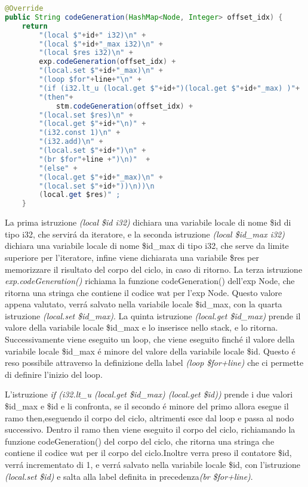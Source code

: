 \documentclass[../../main.tex]{subfiles}
\begin{document}
\begin{lstlisting}[language=Java, caption={codeGeneration() per il for Node}, label={lst:codeGenerationFor}]
@Override
public String codeGeneration(HashMap<Node, Integer> offset_idx) {
    return  
        "(local $"+id+" i32)\n" +
        "(local $"+id+"_max i32)\n" +
        "(local $res i32)\n" +
        exp.codeGeneration(offset_idx) +
        "(local.set $"+id+"_max)\n" +   
        "(loop $for"+line+"\n" +       
        "(if (i32.lt_u (local.get $"+id+")(local.get $"+id+"_max) )"+
        "(then"+
            stm.codeGeneration(offset_idx) +
        "(local.set $res)\n" +
        "(local.get $"+id+"\n)" +     
        "(i32.const 1)\n" +
        "(i32.add)\n" +    
        "(local.set $"+id+")\n" +
        "(br $for"+line +")\n)"  +
        "(else" +
        "(local.get $"+id+"_max)\n" + 
        "(local.set $"+id+"))\n))\n
        (local.get $res)" ;   
    }

\end{lstlisting}

La prima istruzione \textit{(local \$id i32)} dichiara una variabile locale di nome \$id di tipo i32, che servirá da iteratore, e la seconda istruzione \textit{(local \$id\_max i32)} dichiara una variabile locale di nome \$id\_max di tipo i32, che serve da limite superiore per l'iteratore, infine viene dichiarata una variabile \$res per memorizzare il risultato del corpo del ciclo, in caso di ritorno.
La terza istruzione \textit{exp.codeGeneration()} richiama la funzione codeGeneration() dell'exp Node, che ritorna una stringa che contiene il codice wat per l'exp Node.
Questo valore appena valutato, verrá salvato nella variabile locale \$id\_max, con la quarta istruzione \textit{(local.set \$id\_max)}.
La quinta istruzione \textit{(local.get \$id\_max)} prende il valore della variabile locale \$id\_max e lo inserisce nello stack, e lo ritorna.
Successivamente viene eseguito un loop, che viene eseguito finché il valore della variabile locale \$id\_max é minore del valore della variabile locale \$id.
Questo é reso possibile attraverso la definizione della label \textit{(loop \$for+line)} che ci permette di definire l'inizio del loop.

L'istruzione \textit{if (i32.lt\_u (local.get \$id\_max) (local.get \$id))} prende i due valori \$id\_max e \$id e li confronta, se il secondo é minore del primo allora esegue il ramo then,eseguendo il corpo del ciclo, altrimenti esce dal loop e passa al nodo successivo.
Dentro il ramo then viene eseguito il corpo del ciclo, richiamando la funzione codeGeneration() del corpo del ciclo, che ritorna una stringa che contiene il codice wat per il corpo del ciclo.Inoltre verra preso il contatore \$id, verrá incrementato di 1, e verrá salvato nella variabile locale \$id, con l'istruzione \textit{(local.set \$id)} e salta alla label definita in precedenza\textit{(br \$for+line)}.
\end{document}
